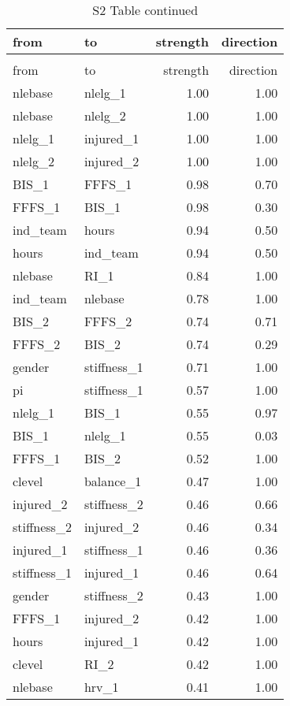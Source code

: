 \documentclass[
]{article}
\begin{document}
\begin{longtable}[t]{l|l|r|r}
\caption{\label{tab:unnamed-chunk-3}}\\
\hline
from & to & strength & direction\\
\hline
\endfirsthead
\caption[]{ S2 Table continued}\\
\hline
from & to & strength & direction\\
\hline
\endhead
nlebase & nlelg\_1 & 1.00 & 1.00\\
\hline
nlebase & nlelg\_2 & 1.00 & 1.00\\
\hline
nlelg\_1 & injured\_1 & 1.00 & 1.00\\
\hline
nlelg\_2 & injured\_2 & 1.00 & 1.00\\
\hline
BIS\_1 & FFFS\_1 & 0.98 & 0.70\\
\hline
FFFS\_1 & BIS\_1 & 0.98 & 0.30\\
\hline
ind\_team & hours & 0.94 & 0.50\\
\hline
hours & ind\_team & 0.94 & 0.50\\
\hline
nlebase & RI\_1 & 0.84 & 1.00\\
\hline
ind\_team & nlebase & 0.78 & 1.00\\
\hline
BIS\_2 & FFFS\_2 & 0.74 & 0.71\\
\hline
FFFS\_2 & BIS\_2 & 0.74 & 0.29\\
\hline
gender & stiffness\_1 & 0.71 & 1.00\\
\hline
pi & stiffness\_1 & 0.57 & 1.00\\
\hline
nlelg\_1 & BIS\_1 & 0.55 & 0.97\\
\hline
BIS\_1 & nlelg\_1 & 0.55 & 0.03\\
\hline
FFFS\_1 & BIS\_2 & 0.52 & 1.00\\
\hline
clevel & balance\_1 & 0.47 & 1.00\\
\hline
injured\_2 & stiffness\_2 & 0.46 & 0.66\\
\hline
stiffness\_2 & injured\_2 & 0.46 & 0.34\\
\hline
injured\_1 & stiffness\_1 & 0.46 & 0.36\\
\hline
stiffness\_1 & injured\_1 & 0.46 & 0.64\\
\hline
gender & stiffness\_2 & 0.43 & 1.00\\
\hline
FFFS\_1 & injured\_2 & 0.42 & 1.00\\
\hline
hours & injured\_1 & 0.42 & 1.00\\
\hline
clevel & RI\_2 & 0.42 & 1.00\\
\hline
nlebase & hrv\_1 & 0.41 & 1.00\\

\end{longtable}
\end{document}
